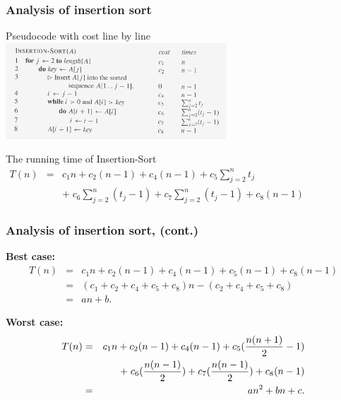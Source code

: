 \documentclass[notes,serif]{beamer}
\begin{document}
\begin{frame}
\frametitle{Analysis of insertion sort}
\begin{exampleblock}{Pseudocode with cost line by line}
\includegraphics[height=3.6cm]{insertion_sort_a2}
\end{exampleblock}
\begin{block}{The running time of Insertion-Sort}
  $
  \begin{array}{lll}
    T(n) &=& c_1 n + c_2 (n-1) + c_4 (n-1) + c_5 \sum_{j=2}^n t_j \\
            & &  +\; c_6 \sum_{j=2}^n (t_j-1) + c_7 \sum_{j=2}^n (t_j-1) + c_8 (n-1)
  \end{array}
  $
\end{block}
\end{frame}

\begin{frame}
\frametitle{Analysis of insertion sort, (cont.)}
\begin{block}{\bf Best case:}
  \begin{eqnarray*}
  T(n) &=& c_1 n + c_2 (n-1) + c_4(n-1) + c_5(n-1) + c_8(n-1) \\
          &=& (c_1 + c_2 + c_4 + c_5 + c_8) n - (c_2 + c_4 + c_5 + c_8) \\
          &=& an + b.
  \end{eqnarray*}
\end{block}
\begin{block}{\bf Worst case:}
  \begin{eqnarray*}
  T(n) &=& c_1 n + c_2 (n-1) + c_4(n-1) + c_5({{n(n+1)} \over 2} -1) \\
          &  & + \; c_6({{n(n-1)} \over 2}) + c_7({{n(n-1)} \over 2}) + c_8(n-1) \\
          &=& an^2 + bn + c.
  \end{eqnarray*}
\end{block}
\end{frame}
\end{document}
